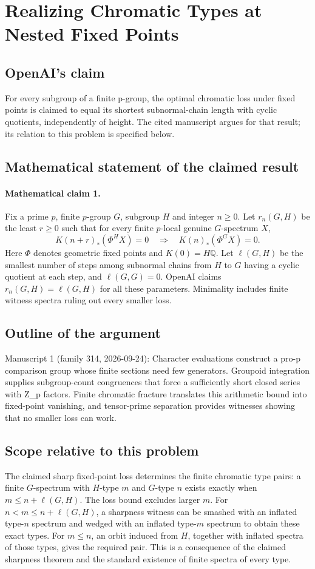\documentclass[11pt]{article}
\begin{document}
\section*{Realizing Chromatic Types at Nested Fixed Points}

\subsection{OpenAI's claim}
For every subgroup of a finite p-group, the optimal chromatic loss under fixed points is claimed to equal its shortest subnormal-chain length with cyclic quotients, independently of height. The cited manuscript argues for that result; its relation to this problem is specified below.

\subsection{Mathematical statement of the claimed result}
\paragraph{Mathematical claim 1.} Fix a prime $p$, finite $p$-group $G$, subgroup $H$ and integer $n\ge0$. Let $r_n(G,H)$ be the least $r\ge0$ such that for every finite $p$-local genuine $G$-spectrum $X$,
\[
K(n+r)_*(\Phi^HX)=0\quad\Longrightarrow\quad K(n)_*(\Phi^GX)=0.
\]
Here $\Phi$ denotes geometric fixed points and $K(0)=H\mathbb Q$. Let $\ell(G,H)$ be the smallest number of steps among subnormal chains from $H$ to $G$ having a cyclic quotient at each step, and $\ell(G,G)=0$. OpenAI claims $r_n(G,H)=\ell(G,H)$ for all these parameters. Minimality includes finite witness spectra ruling out every smaller loss.

\subsection{Outline of the argument}
Manuscript 1 (family 314, 2026-09-24): Character evaluations construct a pro-p comparison group whose finite sections need few generators. Groupoid integration supplies subgroup-count congruences that force a sufficiently short closed series with Z\_p factors. Finite chromatic fracture translates this arithmetic bound into fixed-point vanishing, and tensor-prime separation provides witnesses showing that no smaller loss can work.

\subsection{Scope relative to this problem}
The claimed sharp fixed-point loss determines the finite chromatic type pairs: a finite $G$-spectrum with $H$-type $m$ and $G$-type $n$ exists exactly when $m\le n+\ell(G,H)$. The loss bound excludes larger $m$. For $n<m\le n+\ell(G,H)$, a sharpness witness can be smashed with an inflated type-$n$ spectrum and wedged with an inflated type-$m$ spectrum to obtain these exact types. For $m\le n$, an orbit induced from $H$, together with inflated spectra of those types, gives the required pair. This is a consequence of the claimed sharpness theorem and the standard existence of finite spectra of every type.
\end{document}
